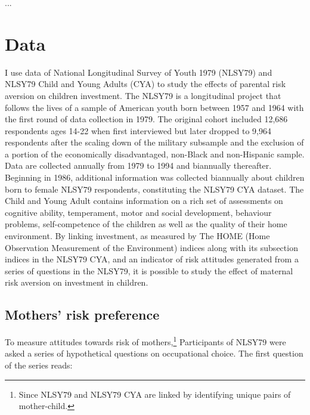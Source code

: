 \documentclass[]{article}
\begin{document}
  

...


\section{Data}
I use data of National Longitudinal Survey of Youth 1979 (NLSY79) and NLSY79 Child and Young Adults (CYA) to study the effects of parental risk aversion on children investment. The NLSY79 is a longitudinal project that follows the lives of a sample of American youth born between 1957 and 1964 with the first round of data collection in 1979. The original cohort included 12,686 respondents ages 14-22 when first interviewed but later dropped to 9,964 respondents after the scaling down of the military subsample and the exclusion of a portion of the economically disadvantaged, non-Black and non-Hispanic sample. Data are collected annually from 1979 to 1994 and biannually thereafter. Beginning in 1986, additional information was collected biannually about children born to female NLSY79 respondents, constituting the NLSY79 CYA dataset. The Child and Young Adult contains information on a rich set of assessments on cognitive ability, temperament, motor and social development, behaviour problems, self-competence of the children as well as the quality of their home environment. By linking investment, as measured by The HOME (Home Observation Measurement of the Environment) indices along with its subsection indices in the NLSY79 CYA, and an indicator of risk attitudes generated from a series of questions in the NLSY79, it is possible to study the effect of maternal risk aversion on investment in children.

\subsection{Mothers' risk preference}
To measure attitudes towards risk of mothers,\footnote{Since NLSY79 and NLSY79 CYA are linked by identifying unique pairs of mother-child.} Participants of NLSY79 were asked a series of hypothetical questions on occupational choice. The first question of the series reads:
\end{document}
